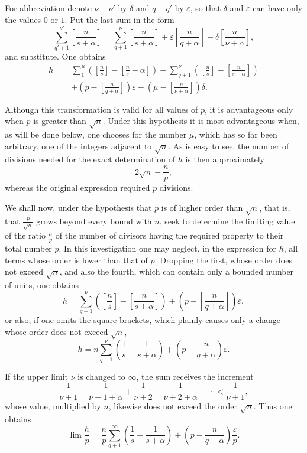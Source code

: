 \documentclass[11pt]{article}
\newcommand{\floor}[1]{\left[#1\right]}
\begin{document}
For abbreviation denote $\nu-\nu'$ by $\delta$ and $q-q'$ by $\varepsilon$, so that $\delta$ and $\varepsilon$ can have only the values $0$ or $1$. Put the last sum in the form
\[
 \sum_{q'+1}^{\nu'}\floor{\frac n{s+\alpha}}
 =\sum_{q+1}^{\nu}\floor{\frac n{s+\alpha}}
 +\varepsilon\floor{\frac n{q+\alpha}}
 -\delta\floor{\frac n{\nu+\alpha}},
\]
and substitute. One obtains
\[
\begin{aligned}
 h={}&\sum_1^{\mu}\left(\floor{\frac ns}-\floor{\frac ns-\alpha}\right)
 +\sum_{q+1}^{\nu}\left(\floor{\frac ns}-\floor{\frac n{s+\alpha}}\right) \\
 &+\left(p-\floor{\frac n{q+\alpha}}\right)\varepsilon
 -\left(\mu-\floor{\frac n{\nu+\alpha}}\right)\delta.
\end{aligned}
\]

Although this transformation is valid for all values of $p$, it is advantageous only when $p$ is greater than $\sqrt n$. Under this hypothesis it is most advantageous when, as will be done below, one chooses for the number $\mu$, which has so far been arbitrary, one of the integers adjacent to $\sqrt n$. As is easy to see, the number of divisions needed for the exact determination of $h$ is then approximately
\[
 2\sqrt n-\frac np,
\]
whereas the original expression required $p$ divisions.

We shall now, under the hypothesis that $p$ is of higher order than $\sqrt n$, that is, that $\frac p{\sqrt n}$ grows beyond every bound with $n$, seek to determine the limiting value of the ratio $\frac hp$ of the number of divisors having the required property to their total number $p$. In this investigation one may neglect, in the expression for $h$, all terms whose order is lower than that of $p$. Dropping the first, whose order does not exceed $\sqrt n$, and also the fourth, which can contain only a bounded number of units, one obtains
\[
 h=\sum_{q+1}^{\nu}\left(\floor{\frac ns}-\floor{\frac n{s+\alpha}}\right)
 +\left(p-\floor{\frac n{q+\alpha}}\right)\varepsilon,
\]
or also, if one omits the square brackets, which plainly causes only a change whose order does not exceed $\sqrt n$,
\[
 h=n\sum_{q+1}^{\nu}\left(\frac1s-\frac1{s+\alpha}\right)+\left(p-\frac n{q+\alpha}\right)\varepsilon.
\]

If the upper limit $\nu$ is changed to $\infty$, the sum receives the increment
\[
 \frac1{\nu+1}-\frac1{\nu+1+\alpha}
 +\frac1{\nu+2}-\frac1{\nu+2+\alpha}+\cdots<\frac1{\nu+1},
\]
whose value, multiplied by $n$, likewise does not exceed the order $\sqrt n$. Thus one obtains
\[
 \lim\frac hp=\frac np\sum_{q+1}^{\infty}\left(\frac1s-\frac1{s+\alpha}\right)
 +\left(p-\frac n{q+\alpha}\right)\frac{\varepsilon}{p}.
\]
\end{document}
